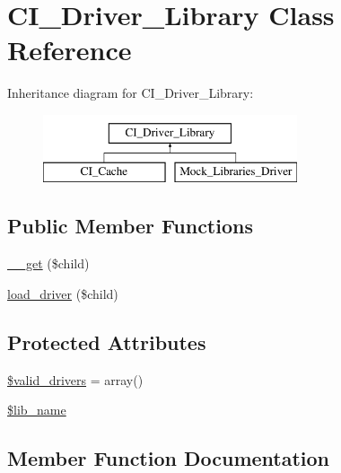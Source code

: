 \hypertarget{class_c_i___driver___library}{}\section{C\+I\+\_\+\+Driver\+\_\+\+Library Class Reference}
\label{class_c_i___driver___library}
Inheritance diagram for C\+I\+\_\+\+Driver\+\_\+\+Library\+:\begin{figure}[H]
\begin{center}
\leavevmode
\includegraphics[height=2.000000cm]{class_c_i___driver___library}
\end{center}
\end{figure}
\subsection*{Public Member Functions}
\begin{DoxyCompactItemize}
\item 
\hyperlink{class_c_i___driver___library_a2fac4d4694e05e7eeba5282bd6ff8caf}{\+\_\+\+\_\+get} (\$child)
\item 
\hyperlink{class_c_i___driver___library_a7cc2908487e106164664ef7d743690b8}{load\+\_\+driver} (\$child)
\end{DoxyCompactItemize}
\subsection*{Protected Attributes}
\begin{DoxyCompactItemize}
\item 
\hyperlink{class_c_i___driver___library_a32d963b3d49fd67f188c1a74d38be6df}{\$valid\+\_\+drivers} = array()
\item 
\hyperlink{class_c_i___driver___library_ab820c27413d5904686c58f6b2941b603}{\$lib\+\_\+name}
\end{DoxyCompactItemize}


\subsection{Member Function Documentation}
\hypertarget{class_c_i___driver___library_a2fac4d4694e05e7eeba5282bd6ff8caf}{}
